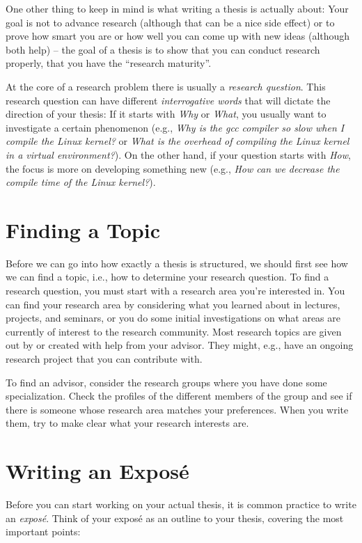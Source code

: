 \documentclass[a4]{article}
\begin{document}
One other thing to keep in mind is what writing a thesis is actually about:
Your goal is not to advance research (although that can be a nice side effect) or to prove how smart you are or how well you can come up with new ideas (although both help) -- the goal of a thesis is to show that you can conduct research properly, that you have the ``research maturity''.

At the core of a research problem there is usually a \emph{research question}.
This research question can have different \emph{interrogative words} that will dictate the direction of your thesis:
If it starts with \emph{Why} or \emph{What}, you usually want to investigate a certain phenomenon (e.g., \emph{Why is the gcc compiler so slow when I compile the Linux kernel?} or \emph{What is the overhead of compiling the Linux kernel in a virtual environment?}).
On the other hand, if your question starts with \emph{How}, the focus is more on developing something new (e.g., \emph{How can we decrease the compile time of the Linux kernel?}).

\section{Finding a Topic}
\label{sec:topic}

Before we can go into how exactly a thesis is structured, we should first see how we can find a topic, i.e., how to determine your research question.
To find a research question, you must start with a research area you're interested in.
You can find your research area by considering what you learned about in lectures, projects, and seminars, or you do some initial investigations on what areas are currently of interest to the research community.
Most research topics are given out by or created with help from your advisor.
They might, e.g., have an ongoing research project that you can contribute with.

To find an advisor, consider the research groups where you have done some specialization.
Check the profiles of the different members of the group and see if there is someone whose research area matches your preferences.
When you write them, try to make clear what your research interests are.

\section{Writing an Expos\'e}
\label{sec:expose}

Before you can start working on your actual thesis, it is common practice to write an \emph{expos\'e}.
Think of your expos\'e as an outline to your thesis, covering the most important points:
\end{document}
